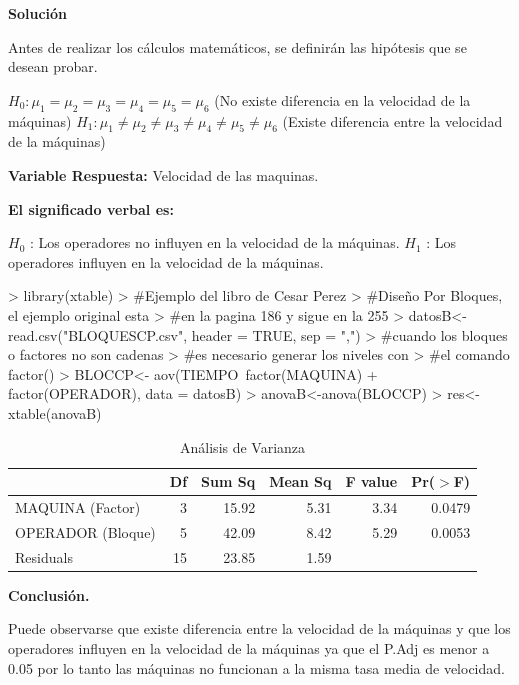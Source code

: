 \documentclass[12pt,letterpaper]{report}
\begin{document}
\textbf{Solución}

Antes de realizar los cálculos matemáticos, se definirán las hipótesis que se desean probar.

$H_0 : \mu_1 = \mu_2 = \mu_3 = \mu_4 = \mu_5 = \mu_6 $ (No existe diferencia en la velocidad de la máquinas)
$H_1 : \mu_1 \not= \mu_2 \not= \mu_3 \not= \mu_4 \not= \mu_5 \not= \mu_6$ (Existe diferencia entre la velocidad de la máquinas)

\textbf{Variable Respuesta:} Velocidad de las maquinas.

\textbf{El significado verbal es:}

$H_0$ : Los operadores no influyen en la velocidad de la máquinas.
$H_1$ : Los operadores influyen en la velocidad de la máquinas.




\begin{Schunk}
\begin{Sinput}
> library(xtable)
> #Ejemplo del libro de Cesar Perez
> #Diseño Por Bloques, el ejemplo original esta
> #en la pagina 186 y sigue en la 255
> datosB<-read.csv("BLOQUESCP.csv", header = TRUE, sep = ",")
> #cuando los bloques o factores no son cadenas
> #es necesario generar los niveles con
> #el comando factor()
> BLOCCP<- aov(TIEMPO~factor(MAQUINA) + factor(OPERADOR), data = datosB)
> anovaB<-anova(BLOCCP)
> res<-xtable(anovaB)
\end{Sinput}
\end{Schunk}

\begin{table}[ht]
\centering
\begin{tabular}{lrrrrr}
  \hline
 & Df & Sum Sq & Mean Sq & F value & Pr($>$F) \\ 
  \hline
  MAQUINA (Factor) & 3 & 15.92 & 5.31 & 3.34 & 0.0479 \\ 
  OPERADOR (Bloque) & 5 & 42.09 & 8.42 & 5.29 & 0.0053 \\ 
  Residuals & 15 & 23.85 & 1.59 &  &  \\ 
   \hline
\end{tabular}
\caption{Análisis de Varianza}
\end{table}

\textbf{Conclusión.}

Puede observarse que existe diferencia entre la velocidad de la máquinas y que los operadores influyen en la velocidad de la máquinas ya que el P.Adj es menor a 0.05 por lo tanto las máquinas no funcionan a la misma tasa media de velocidad.
\end{document}
